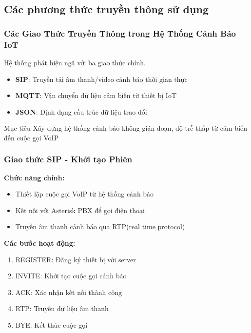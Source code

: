 \subsection{Các phương thức truyền thông sử dụng}

\begin{frame}
\frametitle{Các Giao Thức Truyền Thông trong Hệ Thống Cảnh Báo IoT}
\begin{center}
\Large Hệ thống phát hiện ngã với ba giao thức chính.
\end{center}

\begin{itemize}
\item \textbf{SIP}: Truyền tải âm thanh/video cảnh báo thời gian thực
\item \textbf{MQTT}: Vận chuyển dữ liệu cảm biến từ thiết bị IoT
\item \textbf{JSON}: Định dạng cấu trúc dữ liệu trao đổi
\end{itemize}

\begin{block}{Mục tiêu}
Xây dựng hệ thống cảnh báo không gián đoạn, độ trễ thấp từ cảm biến đến cuộc gọi VoIP
\end{block}
\end{frame}

\begin{frame}
\frametitle{Giao thức SIP - Khởi tạo Phiên}
\textbf{Chức năng chính:}
\begin{itemize}
\item Thiết lập cuộc gọi VoIP từ hệ thống cảnh báo
\item Kết nối với Asterisk PBX để gọi điện thoại
\item Truyền âm thanh cảnh báo qua RTP(real time protocol)
\end{itemize}

\textbf{Các bước hoạt động:}
\begin{enumerate}
\item REGISTER: Đăng ký thiết bị với server
\item INVITE: Khởi tạo cuộc gọi cảnh báo
\item ACK: Xác nhận kết nối thành công
\item RTP: Truyền dữ liệu âm thanh
\item BYE: Kết thúc cuộc gọi
\end{enumerate}
\end{frame}

